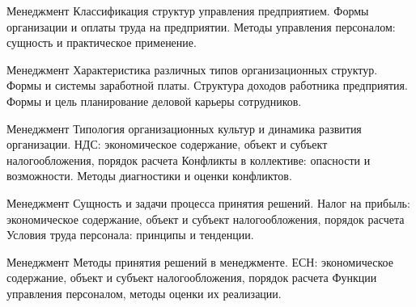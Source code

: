 \documentclass[
	11pt,
	a4paper,
	]
	{article}
\begin{document}
\vfill



\begin{minipage}[t][\miniH]{\miniL}\centering
	 {Менеджмент}
		{
			Классификация структур управления предприятием.
		}{
			Формы организации и оплаты труда на предприятии.
		}{
			Методы управления персоналом: сущность и практическое применение.
		}
	\lowGE
\end{minipage}

\vfill



\begin{minipage}[t][\miniH]{\miniL}\centering
	 {Менеджмент}
		{
			Характеристика различных типов организационных структур.
		}{
			Формы и системы заработной платы. Структура доходов работника предприятия.
		}{
			Формы и цель планирование деловой карьеры сотрудников.
		}
	\lowGE
\end{minipage}





\begin{minipage}[t][\miniH]{\miniL}\centering
	 {Менеджмент}
		{
			Типология организационных культур и динамика развития организации.
		}{
			НДС: экономическое содержание, объект и субъект налогообложения, порядок расчета
		}{
			Конфликты в коллективе: опасности и возможности. Методы диагностики и оценки конфликтов.
		}
	\lowGE
\end{minipage}

\vfill



\begin{minipage}[t][\miniH]{\miniL}\centering
	 {Менеджмент}
		{
			Сущность и задачи процесса принятия решений.
		}{
			Налог на прибыль: экономическое содержание, объект и субъект налогообложения, порядок расчета
		}{
			Условия труда персонала: принципы и тенденции.
		}
	\lowGE
\end{minipage}

\vfill



\begin{minipage}[t][\miniH]{\miniL}\centering
	 {Менеджмент}
		{
			Методы принятия решений в менеджменте.
		}{
			ЕСН: экономическое содержание, объект и субъект налогообложения, порядок расчета
		}{
			Функции управления персоналом, методы оценки их реализации.
		}
	\lowGE
\end{minipage}
\end{document}
